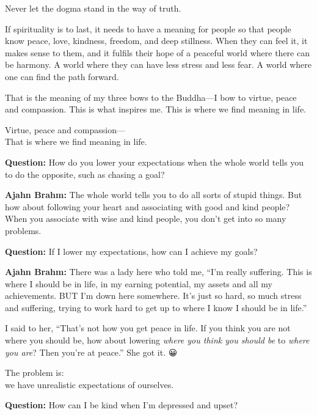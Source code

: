 \documentclass[12pt, openany]{book}
\newenvironment{aphorism}%
{%
\begin{center}\begin{itshape}
}%
{\end{itshape}\end{center}
}%
\begin{document}
\begin{aphorism}
Never let the dogma stand in the way of truth.
\end{aphorism}

If spirituality is to last, it needs to have a meaning for people so that people know peace, love, kindness, freedom, and deep stillness. When they can feel it, it makes sense to them, and it fulfils their hope of a peaceful world where there can be harmony. A world where they can have less stress and less fear. A world where one can find the path forward. 

That is the meaning of my three bows to the Buddha—I bow to virtue, peace and compassion. This is what inspires me. This is where we find meaning in life. 

\begin{aphorism}
Virtue, peace and compassion—\\  
That is where we find meaning in life.
\end{aphorism}

\textbf{Question:} How do you lower your expectations when the whole world tells you to do the opposite, such as chasing a goal? 

\textbf{Ajahn Brahm:} The whole world tells you to do all sorts of stupid things. But how about following your heart and associating with good and kind people? When you associate with wise and kind people, you don’t get into so many problems. 

\textbf{Question:} If I lower my expectations, how can I achieve my goals? 

\textbf{Ajahn Brahm:} There was a lady here who told me, “I’m really suffering. This is where I should be in life, in my earning potential, my assets and all my achievements. BUT I’m down here somewhere. It’s just so hard, so much stress and suffering, trying to work hard to get up to where I know I should be in life.” 

I said to her, “That’s not how you get peace in life. If you think you are not where you should be, how about lowering \emph{where you think you should be} to \emph{where you are}? Then you’re at peace.” She got it. 😀

\begin{aphorism}
The problem is:\\  
we have unrealistic expectations of ourselves.
\end{aphorism}

\textbf{Question:} How can I be kind when I’m depressed and upset? 
\end{document}
